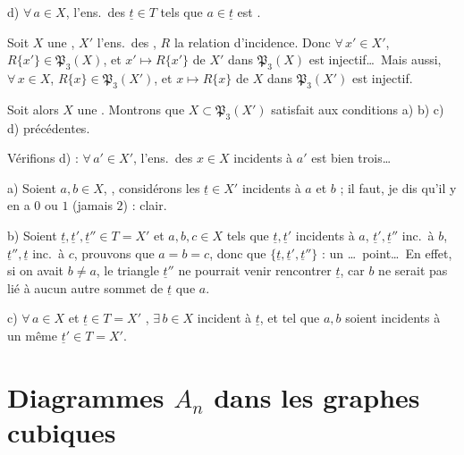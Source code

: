 \documentclass[11pt,a4paper]{article}
\begin{document}
d) $\forall\, a \in X$, l'ens.\ des $\underline{t} \in T$ tels que $a \in \underline{t}$ est  .

Soit $X$ une ,  $X'$ l'ens.\ des  , $R$ la relation d'incidence. Donc $\forall\, x' \in X'$, $R\{x'\} \in \mathfrak{P}_3(X)$, et $x' \mapsto R\{x'\}$ de $X'$ dans $\mathfrak{P}_3(X)$ est injectif\ldots\ Mais aussi, $\forall\, x \in X$, $R\{x\} \in \mathfrak{P}_3(X')$, et $x \mapsto R\{x\}$ de $X$ dans $\mathfrak{P}_3(X')$ est injectif.

Soit alors $X$ une \uncertain{\ill{}}. Montrons que $X \subset \mathfrak{P}_3(X')$ satisfait aux conditions a) b) c) d) précédentes.

Vérifions d) : $\forall\, a' \in X'$, l'ens.\ des $x \in X$ incidents à $a'$ est bien trois\ldots

a) Soient $a, b \in X$, , considérons les $\underline{t} \in X'$ incidents à $a$ et $b$ ; il faut, je dis qu'il y en a $0$ ou $1$ (jamais $2$) : clair.

b) Soient $\underline{t}, \underline{t}', \underline{t}'' \in T = X'$  et $a,b,c \in X$ tels que $\underline{t}, \underline{t}'$ incidents à $a$, $\underline{t}', \underline{t}''$ inc.\ à $b$, $\underline{t}'', \underline{t}$ inc.\ à $c$, prouvons que $a = b = c$, donc que $\{\underline{t}, \underline{t}', \underline{t}''\}$ \uncertain{\ill{}} : un \ldots\ point\ldots\ En effet, si on avait $b \neq a$, le triangle $\underline{t}''$ ne pourrait venir rencontrer $\underline{t}$, car $b$ ne serait pas lié à aucun autre sommet de $\underline{t}$ que $a$.


c) $\forall\, a \in X$ et $\underline{t} \in T = X'$ , $\exists\, b \in X$ incident à $\underline{t}$, et tel que $a, b$ soient incidents à un même $\underline{t}' \in T = X'$.


\section{Diagrammes $A_n$ dans les graphes cubiques}
\end{document}
